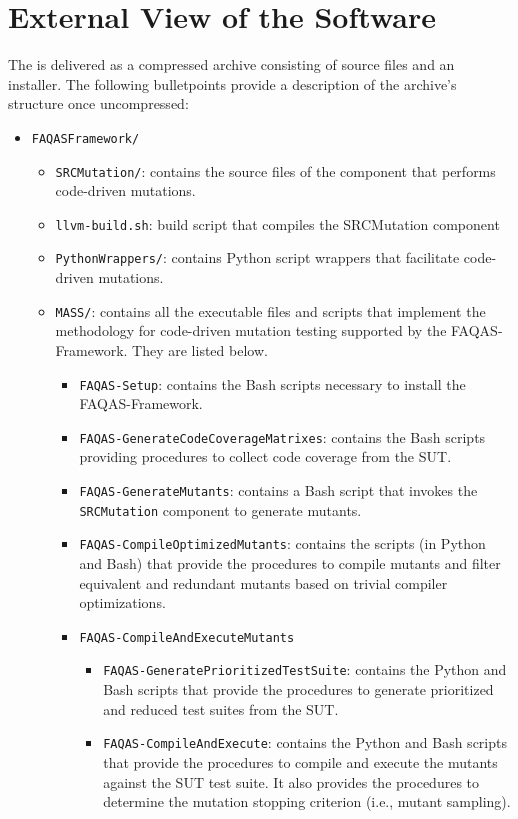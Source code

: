 
\chapter{External View of the Software}

The \FAQAS is delivered as a compressed archive consisting of source files and an installer.
The following bulletpoints provide a description of the archive's structure once uncompressed:

\begin{itemize}
	\item \texttt{FAQASFramework/}
	\begin{itemize}
		\item \texttt{SRCMutation/}: contains the source files of the component that performs code-driven mutations.
		\item \texttt{llvm-build.sh}: build script that compiles the SRCMutation component
		\item \texttt{PythonWrappers/}: contains Python script wrappers that facilitate code-driven mutations.
		\item \texttt{MASS/}: contains all the executable files and scripts that implement the methodology for code-driven mutation testing supported by  the FAQAS-Framework. They are listed below.
		\begin{itemize}
			\item \texttt{FAQAS-Setup}: contains the Bash scripts necessary to install the FAQAS-Framework.
			\item \texttt{FAQAS-GenerateCodeCoverageMatrixes}: contains the Bash scripts providing procedures to collect code coverage from the SUT.
			\item \texttt{FAQAS-GenerateMutants}: contains a Bash script that invokes the \texttt{SRCMutation} component to generate mutants.
			\item \texttt{FAQAS-CompileOptimizedMutants}: contains the scripts (in Python and Bash)  that provide the procedures to compile mutants and filter equivalent and redundant mutants based on trivial compiler optimizations.
			\item \texttt{FAQAS-CompileAndExecuteMutants}
			\begin{itemize}
				\item \texttt{FAQAS-GeneratePrioritizedTestSuite}: contains the Python and Bash scripts that provide the procedures to generate prioritized and reduced test suites from the SUT.

				\item \texttt{FAQAS-CompileAndExecute}: contains the Python and Bash scripts that provide the procedures to compile and execute the mutants against the SUT test suite. It also provides the procedures to determine the mutation stopping criterion (i.e., mutant sampling).


\end{itemize}
\end{itemize}
\end{itemize}
\end{itemize}
